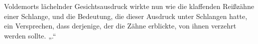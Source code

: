 Voldemorts lächelnder Gesichtsausdruck wirkte nun wie die klaffenden Reißzähne einer Schlange, und die Bedeutung, die dieser Ausdruck unter Schlangen hatte, ein Versprechen, dass derjenige, der die Zähne erblickte, von ihnen verzehrt werden sollte.
„.“


